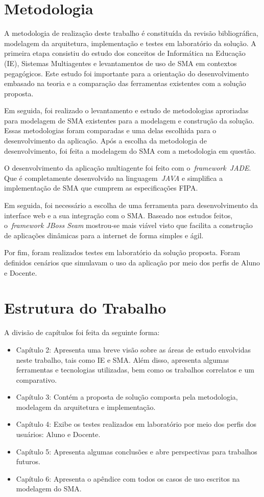 \section{Metodologia}

A metodologia de realização deste trabalho é constituída da revisão bibliográfica, modelagem da arquitetura, implementação e testes em laboratório da solução. A primeira etapa consistiu do estudo dos conceitos de Informática na Educação (IE), Sistemas Multiagentes e levantamentos de uso de SMA em contextos pegagógicos. Este estudo foi importante para a orientação do desenvolvimento embasado na teoria e a comparação das ferramentas existentes com a solução proposta.

Em seguida, foi realizado o levantamento e estudo de metodologias aproriadas para modelagem de SMA existentes para a modelagem e construção da solução. Essas metodologias foram comparadas e uma delas escolhida para o desenvolvimento da aplicação. Após a escolha da metodologia de desenvolvimento, foi feita a modelagem do SMA com a metodologia em questão.

O desenvolvimento da aplicação multiagente foi feito com o~\emph{framework}~\emph{JADE}. Que é completamente desenvolvido na linguagem~\emph{JAVA} e simplifica a implementação de SMA que cumprem as especificações FIPA. 

Em seguida, foi necessário a escolha de uma ferramenta para desenvolvimento da interface web e a sua integração com o SMA. Baseado nos estudos feitos, o~\emph{framework JBoss Seam} mostrou-se mais viável visto que facilita a construção de aplicações dinâmicas para a internet de forma simples e ágil.

Por fim, foram realizados testes em laboratório da solução proposta. Foram definidos cenários que simulavam o uso da aplicação por meio dos perfis de Aluno e Docente.

\section{Estrutura do Trabalho}
A divisão de capítulos foi feita da seguinte forma:
\begin{itemize}
	\item Capítulo 2: Apresenta uma breve visão sobre as áreas de estudo envolvidas neste trabalho, tais como IE e SMA. Além disso, apresenta algumas ferramentas e tecnologias utilizadas, bem como os trabalhos correlatos e um comparativo.
	\item Capítulo 3: Contém a proposta de solução composta pela metodologia, modelagem da arquitetura e implementação.
	\item Capítulo 4: Exibe os testes realizados em laboratório por meio dos perfis dos usuários: Aluno e Docente.
	\item Capítulo 5: Apresenta algumas conclusões e abre perspectivas para trabalhos futuros.
	\item Capítulo 6: Apresenta o apêndice com todos os casos de uso escritos na modelagem do SMA.
\end{itemize}
